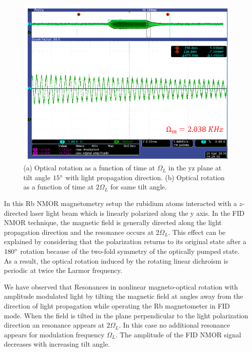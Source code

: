 \begin{figure}
  \includegraphics[width=\textwidth,trim={0.4cm 0cm 0.5cm 10.9cm},clip]{figures/transversefield}
  
  \caption{(a) Optical rotation as a function of time at $\Omega_L$ in
    the yz plane at tilt angle $15\degree$ with light propagation
    direction. (b) Optical rotation as a function of time at
    $2\Omega_L$ for same tilt angle.}
    \label{fig:tilted}
\end{figure}
In this Rb NMOR magnetometry setup the rubidium atoms interacted with a $z$-directed laser light beam which is linearly polarized
along the y axis. In the FID NMOR technique, the magnetic field is generally directed along the light propagation direction and the resonance occurs at $2\Omega_L$.  This effect can be explained by considering that the polarization returns to its original state after a $180\degree$ rotation because of the two-fold symmetry of the optically pumped state. As a result, the optical rotation induced by the rotating linear dichroism is periodic at twice the Larmor frequency.

We have observed that Resonances in nonlinear magneto-optical rotation with amplitude modulated light by tilting the magnetic field at angles away from the direction of light propagation while operating the Rb magnetometer in FID mode. When the field is tilted in the plane perpendicular to the light polarization direction an resonance appears at $2\Omega_L$. In this case no additional resonance appears for modulation frequency $\Omega_L$. The amplitude of the FID NMOR signal decreases with increasing tilt angle. 

